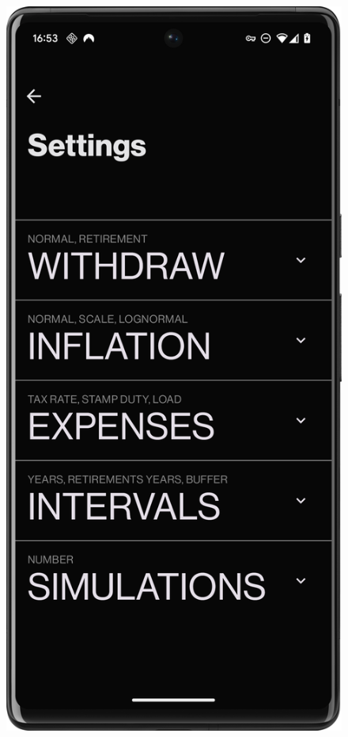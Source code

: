 \begin{figure}[H]
\begin{minipage}{0.24\textwidth}
        \label{fig:simulation_screen}
    \end{minipage}
    \hfill
    \begin{minipage}{0.24\textwidth}
        \centering
        \includegraphics[width=\textwidth]{foto/settings_screen}

\end{minipage}
\end{figure}
